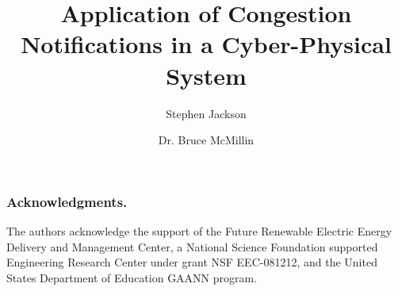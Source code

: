 \documentclass{llncs}
\begin{document}
%
\frontmatter          %
%
\pagestyle{headings}  %
%
\mainmatter
\title{Application of Congestion Notifications in a Cyber-Physical System}
%
%
\author{Stephen Jackson \and Dr. Bruce McMillin }
%
%
%

\maketitle              %



\begin{abstract}


\end{abstract}








\subsubsection*{Acknowledgments.}

The authors acknowledge the support of the Future Renewable
Electric Energy Delivery and Management Center,
a National Science Foundation supported Engineering Research
Center under grant NSF EEC-081212, and the United States Department of Education GAANN program.

%
%


%
\end{document}
